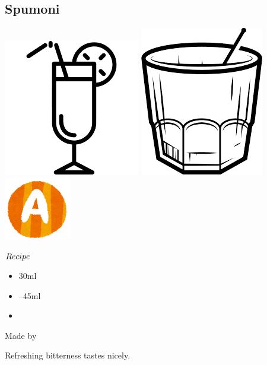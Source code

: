 \subsection{Spumoni}
\vspace{-7.6mm}
\hspace{29mm}
\includegraphics[scale=.07]{cocktail_glass_tall.png}
\includegraphics[scale=.06]{cocktail_glass_rock.png}
\includegraphics[scale=.12]{capital_a.png}
\vspace{2.5mm}
\begin{itembox}[l]{\boldmath $Recipe$}
\begin{itemize}
\setlength{\parskip}{0cm}
\setlength{\itemsep}{0cm}
\item \campari 30ml
\item {}--45ml
\item \tw
\end{itemize}
\vspace{-4mm}
Made by \build
\end{itembox}
Refreshing bitterness tastes nicely.
